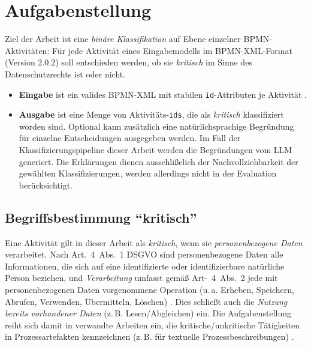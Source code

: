 \section{Aufgabenstellung}\label{sec:aufgabenstellung}

Ziel der Arbeit ist eine \emph{binäre Klassifikation} auf Ebene einzelner \ac{BPMN}-Aktivitäten: Für jede Aktivität eines Eingabemodells im \ac{BPMN}-XML-Format (Version 2.0.2) \cite{omgbpmn} soll entschieden werden, ob sie \emph{kritisch} im Sinne des Datenschutzrechts ist oder nicht.

\begin{itemize}
    \item \textbf{Eingabe} ist ein valides \ac{BPMN}-XML mit stabilen \texttt{id}-Attributen je Aktivität \cite{omgbpmn}.
    \item \textbf{Ausgabe} ist eine Menge von Aktivitäts-\texttt{ids}, die als \emph{kritisch} klassifiziert worden sind. Optional kann zusätzlich eine natürlichsprachige Begründung für einzelne Entscheidungen ausgegeben werden. Im Fall der Klassifizierungspipeline dieser Arbeit werden die Begründungen vom \ac{LLM} generiert. Die Erklärungen dienen ausschlißelich der Nachvollziehbarkeit der gewählten Klassifizierungen, werden allerdings nicht in der Evaluation berücksichtigt.
\end{itemize}

\subsection*{Begriffsbestimmung \enquote{kritisch}}

Eine Aktivität gilt in dieser Arbeit als \emph{kritisch}, wenn sie \emph{personenbezogene Daten} verarbeitet. Nach Art.~4~Abs.~1 \ac{DSGVO} sind personenbezogene Daten alle Informationen, die sich auf eine identifizierte oder identifizierbare natürliche Person beziehen, und \emph{Verarbeitung} umfasst gemäß Art-~4~Abs.~2 jede mit personenbezogenen Daten vorgenommene Operation (u.\,a. Erheben, Speichern, Abrufen, Verwenden, Übermitteln, Löschen) \cite{GDPR2016}. Dies schließt auch die \emph{Nutzung bereits vorhandener Daten} (z.\,B. Lesen/Abgleichen) ein.
Die Aufgabenstellung reiht sich damit in verwandte Arbeiten ein, die kritische/unkritische Tätigkeiten in Prozessartefakten kennzeichnen (z.\,B. für textuelle Prozessbeschreibungen) \cite{nake2023towards}.